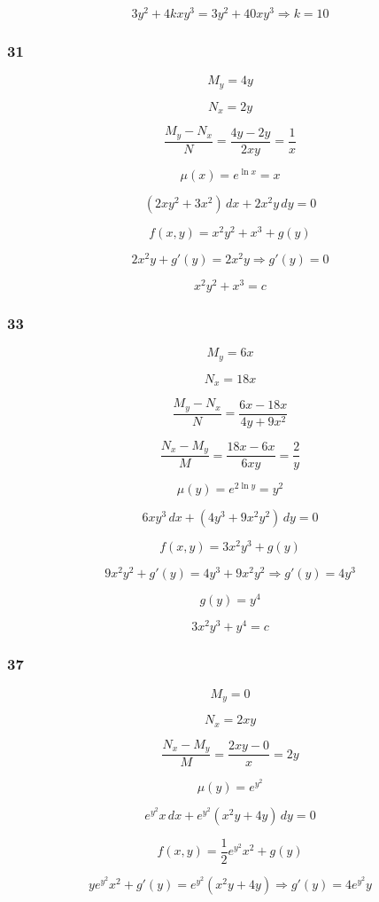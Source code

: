 \documentclass{article}
\begin{document}
\[3 y^2 + 4 k x y^3 = 3 y^2 + 40 x y^3 \Rightarrow k = 10\]

\subsubsection{31}

\[M_y = 4 y\]

\[N_x = 2 y\]

\[\frac{M_y - N_x}{N} = \frac{4 y - 2 y}{2 x y} = \frac{1}{x}\]

\[\mu(x) = e^{\ln x} = x\]

\[(2 x y^2 + 3 x^2) \,d x + 2 x^2 y \,d y = 0\]

\[f(x, y) = x^2 y^2 + x^3 + g(y)\]

\[2 x^2 y + g'(y) = 2 x^2 y \Rightarrow g'(y) = 0\]

\[x^2 y^2 + x^3 = c\]

\subsubsection{33}

\[M_y = 6 x\]

\[N_x = 18 x\]

\[\frac{M_y - N_x}{N} = \frac{6 x - 18 x}{4 y + 9 x^2}\]

\[\frac{N_x - M_y}{M} = \frac{18 x - 6 x}{6 x y} = \frac{2}{y}\]

\[\mu(y) = e^{2 \ln y} = y^2\]

\[6 x y^3 \,d x + (4 y^3 + 9 x^2 y^2) \,d y = 0\]

\[f(x, y) = 3 x^2 y^3 + g(y)\]

\[9 x^2 y^2 + g'(y) = 4 y^3 + 9 x^2 y^2 \Rightarrow g'(y) = 4 y^3\]

\[g(y) = y^4\]

\[3 x^2 y^3 + y^4 = c\]

\subsubsection{37}

\[M_y = 0\]

\[N_x = 2 x y\]

\[\frac{N_x - M_y}{M} = \frac{2 x y - 0}{x} = 2 y\]

\[\mu(y) = e^{y^2}\]

\[e^{y^2} x \,d x + e^{y^2} (x^2 y + 4 y) \,d y = 0\]

\[f(x, y) = \frac{1}{2} e^{y^2} x^2 + g(y)\]

\[y e^{y^2} x^2 + g'(y) = e^{y^2} (x^2 y + 4 y) \Rightarrow g'(y) = 4 e^{y^2} y\]
\end{document}
